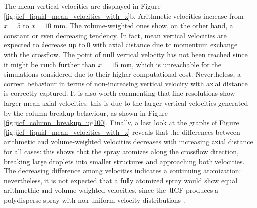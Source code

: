 The mean vertical velocities are displayed in Figure \ref{fig:jicf_liquid_mean_velocities_with_x}b. Arithmetic velocities increase from $x = 5$ to $x = 10$ mm. The volume-weighted ones show, on the other hand, a constant or even decreasing tendency. In fact, mean vertical velocities are expected to decrease up to 0 with axial distance due to momentum exchange with the crossflow. The point of null vertical velocity has not been reached since it might be much further than $x = 15$ mm, which is unreachable for the simulations considered due to their higher computational cost. Nevertheless, a correct behaviour in terms of non-increasing vertical velocity with axial distance is correctly captured. It is also worth commenting that fine resolutions show larger mean axial velocities: this is due to the larger vertical velocities generated by the column breakup behaviour, as shown in Figure \ref{fig:jicf_column_breakup_ug100}. Finally, a last look at the graphs of Figure \ref{fig:jicf_liquid_mean_velocities_with_x} reveals that the differences between arithmetic and volume-weighted velocities decreases with increasing axial distance for all cases: this shows that the spray atomizes along the crossflow direction, breaking large droplets into smaller structures and approaching both velocities. The decreasing difference among velocities indicates a continuing atomization: nevertheless, it is not expected that a fully atomized spray would show equal arithmethic and volume-weighted velocities, since the JICF produces a polydisperse spray with non-uniform velocity distributions \citepColor[wu_spray_1998].




